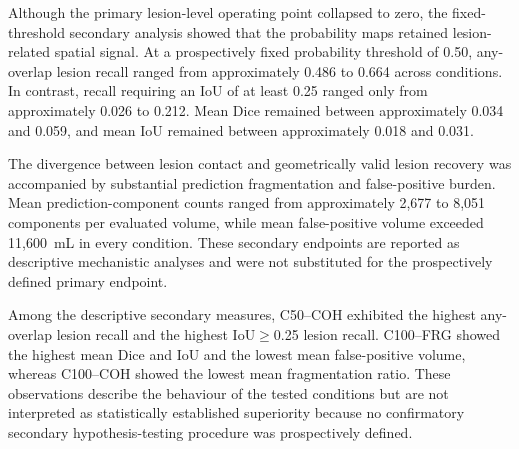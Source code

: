 Although the primary lesion-level operating point collapsed to zero, the
fixed-threshold secondary analysis showed that the probability maps retained
lesion-related spatial signal. At a prospectively fixed probability threshold of
0.50, any-overlap lesion recall ranged from approximately 0.486 to 0.664 across
conditions. In contrast, recall requiring an IoU of at least 0.25 ranged only
from approximately 0.026 to 0.212. Mean Dice remained between approximately
0.034 and 0.059, and mean IoU remained between approximately 0.018 and 0.031.

The divergence between lesion contact and geometrically valid lesion recovery
was accompanied by substantial prediction fragmentation and false-positive
burden. Mean prediction-component counts ranged from approximately 2,677 to
8,051 components per evaluated volume, while mean false-positive volume exceeded
11,600~mL in every condition. These secondary endpoints are reported as
descriptive mechanistic analyses and were not substituted for the prospectively
defined primary endpoint.

Among the descriptive secondary measures, C50--COH exhibited the highest
any-overlap lesion recall and the highest IoU$\geq$0.25 lesion recall. C100--FRG
showed the highest mean Dice and IoU and the lowest mean false-positive volume,
whereas C100--COH showed the lowest mean fragmentation ratio. These observations
describe the behaviour of the tested conditions but are not interpreted as
statistically established superiority because no confirmatory secondary
hypothesis-testing procedure was prospectively defined.
